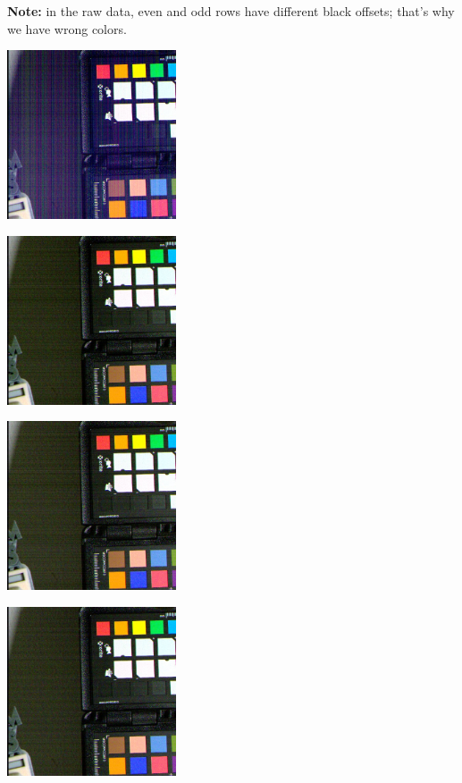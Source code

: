 \textbf{Note:} in the raw data, even and odd rows have different black offsets; that's why we have wrong colors. \\

\begin{center}
\includegraphics[height=5cm]{images/10ms+4-totally-raw-crop}
\end{center}

\begin{center}
\includegraphics[height=5cm]{images/10ms+4-no-blackcol-crop}
\end{center}

\begin{center}
\includegraphics[height=5cm]{images/10ms+4-darkcurrent-no-blackcol-crop}
\end{center}

\begin{center}
\includegraphics[height=5cm]{images/10ms+4-darkcurrent-crop}
\end{center}



